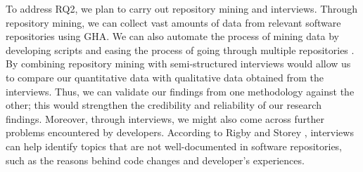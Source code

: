 \documentclass[conference]{IEEEtran}
\begin{document}
       To address RQ2, we plan to carry out repository mining and interviews. Through repository mining, we can collect vast amounts of data from relevant software repositories using GHA. We can also automate the process of mining data by developing scripts and easing the process of going through multiple repositories \cite{chaturvedi2013tools}. By combining repository mining with semi-structured interviews would allow us to compare our quantitative data with qualitative data obtained from the interviews. Thus, we can validate our findings from one methodology against the other; this would strengthen the credibility and reliability of our research findings. Moreover, through interviews, we might also come across further problems encountered by developers. According to Rigby and Storey \cite{rigby2013understanding}, interviews can help identify topics that are not well-documented in software repositories, such as the reasons behind code changes and developer’s experiences.\\
\end{document}

